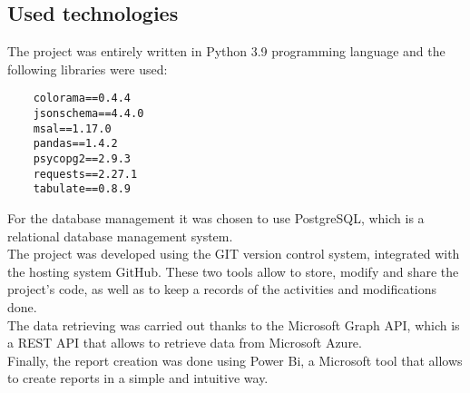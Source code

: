 \documentclass[12pt, a4paper, oneside]{article}
\begin{document}
\subsection{Used technologies}
The project was entirely written in Python 3.9 programming language and the following libraries were used:
\begin{verbatim}
    colorama==0.4.4
    jsonschema==4.4.0
    msal==1.17.0
    pandas==1.4.2   
    psycopg2==2.9.3
    requests==2.27.1
    tabulate==0.8.9
\end{verbatim}
For the database management it was chosen to use PostgreSQL, which is a relational database management system.\\
The project was developed using the GIT version control system, integrated with the hosting system GitHub. These two tools allow to store, modify and share the project's code, as well as to keep a records
of the activities and modifications done.\\
The data retrieving was carried out thanks to the Microsoft Graph API, which is a REST API that allows to retrieve data from Microsoft Azure.\\
Finally, the report creation was done using Power Bi, a Microsoft tool that allows to create reports in a simple and intuitive way.\\
\end{document}

